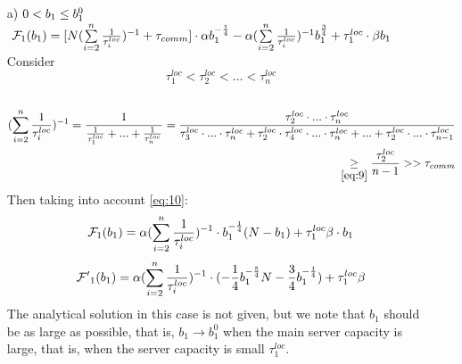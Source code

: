\documentclass{article}
\begin{document}
\begin{itemize}
    \item [a)] $0 < b_1 \leq b_1^0\\$
    $~\mathcal{F}_1(b_1) = [N (\sum\limits_{i = 2}^{n} \frac{1}{\tau_i^{loc}})^{-1} + \tau_{comm}]\cdot 
    \alpha  b_1^{-\frac{1}{4}} - 
    \alpha(\sum\limits_{i =
    2}^{n} \frac{1}{\tau_i^{loc}})^{-1} b_1^{\frac{3}{4}}  + \tau_1^{loc}\cdot\beta b_1\\$
    Consider
    \begin{equation}
        \label{eq:9}
        \tau_1^{loc} < \tau_2^{loc} < ... < \tau_n^{loc}
    \end{equation}\\
    \begin{eqnarray}
        \label{eq:10}
        \begin{split}
            (\sum\limits_{i = 2}^n \frac{1}{\tau_i^{loc}})^{-1} = \frac{1}{\frac{1}{\tau_1^{loc}} + ... + \frac{1}{\tau_n^{loc}} } = \frac{\tau_2^{loc}\cdot ... \cdot\tau_n^{loc}}{\tau_3^{loc}\cdot ... \cdot\tau_n^{loc} + \tau_2^{loc}\cdot \tau_4^{loc}\cdot... \cdot\tau_n^{loc} + ... + \tau_2^{loc}\cdot ... \cdot\tau_{n-1}^{loc}}\\ \underset{\ref{eq:9}}{\geq}\frac{\tau_2^{loc}}{n - 1} >> \tau_{comm}
        \end{split}
    \end{eqnarray}
    Then taking into account \ref{eq:10}:
    \begin{eqnarray}
        \notag
        \begin{split}
            \mathcal{F}_1(b_1) = \alpha(\sum\limits_{i = 2}^n \frac{1}{\tau_i^{loc}})^{-1}\cdot b_1^{-\frac{1}{4}}(N - b_1) + \tau_1^{loc}\beta\cdot b_1
        \end{split}
    \end{eqnarray}
    \begin{equation}
    \notag
        \mathcal{F'}_1 (b_1) = \alpha(\sum\limits_{i = 2}^n \frac{1}{\tau_i^{loc}})^{-1}\cdot (-\frac{1}{4}b_1^{-\frac{5}{4}}N - \frac{3}{4}b_1^{-\frac{1}{4}}) + \tau_1^{loc}\beta
    \end{equation}
    The analytical solution in this case is not given, but we note that $b_1$ should be as large as possible, that is, $b_1\rightarrow b_1^0$ when the main server capacity is large, that is, when the server capacity is small $\tau_1^{loc}$. 


\end{itemize}
\end{document}
